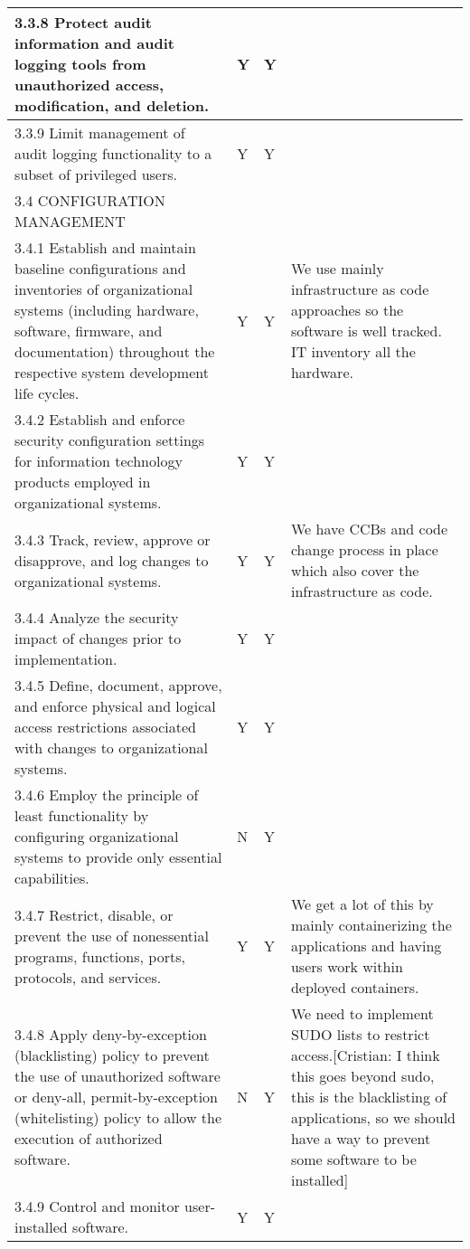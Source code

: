 \begin{longtable} {|p{}|p{}|p{}|p{} |}
{3.3.8 Protect audit information and audit logging tools from unauthorized access, modification, and deletion.}&{Y}&{Y}& \\ \hline
{3.3.9 Limit management of audit logging functionality to a subset of privileged users.}&{Y}&{Y}& \\ \hline
{3.4 CONFIGURATION MANAGEMENT}&&& \\ \hline
{3.4.1 Establish and maintain baseline configurations and inventories of organizational systems (including hardware, software, firmware, and documentation) throughout the respective system development life cycles.}&{Y}&{Y}&{We use mainly infrastructure as code approaches so the software is well tracked. IT inventory all the hardware. } \\ \hline
{3.4.2 Establish and enforce security configuration settings for information technology products employed in organizational systems.}&{Y}&{Y}& \\ \hline
{3.4.3 Track, review, approve or disapprove, and log changes to organizational systems.}&{Y}&{Y}&{We have CCBs and code change process in place which also cover the infrastructure as code. } \\ \hline
{3.4.4 Analyze the security impact of changes prior to implementation.}&{Y}&{Y}& \\ \hline
{3.4.5 Define, document, approve, and enforce physical and logical access restrictions associated with changes to organizational systems.}&{Y}&{Y}& \\ \hline
{3.4.6 Employ the principle of least functionality by configuring organizational systems to provide only essential capabilities.}&{N}&{Y}& \\ \hline
{3.4.7 Restrict, disable, or prevent the use of nonessential programs, functions, ports, protocols, and services.}&{Y}&{Y}&{We get a lot of this by mainly containerizing the applications and having users work within deployed containers.} \\ \hline
{3.4.8 Apply deny-by-exception (blacklisting) policy to prevent the use of unauthorized software or deny-all, permit-by-exception (whitelisting) policy to allow the execution of authorized software.}&{N}&{Y}&{We need to implement SUDO lists to restrict access.[Cristian: I think this goes beyond sudo, this is the blacklisting of applications, so we should have a way to prevent some software to be installed]} \\ \hline
{3.4.9 Control and monitor user-installed software.}&{Y}&{Y}& \\ \hline

\end{longtable}
